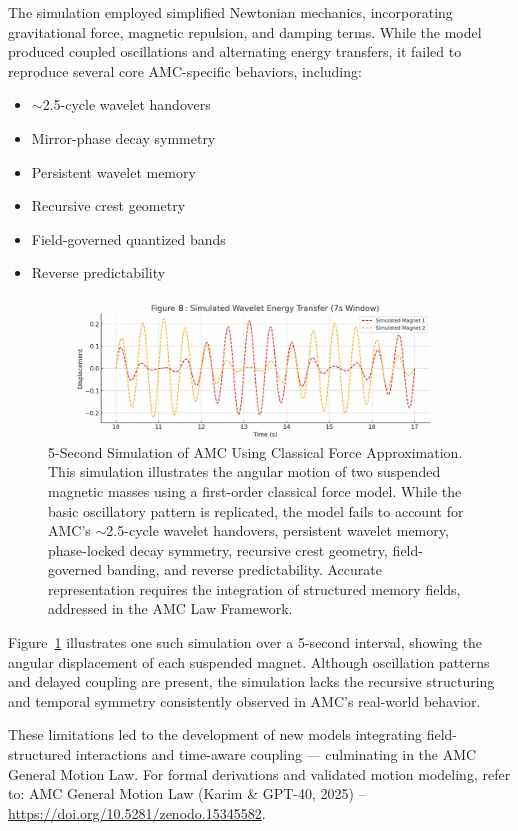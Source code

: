 \documentclass[10pt,aps,pre,onecolumn,superscriptaddress,notitlepage]{revtex4-2}
\begin{document}
The simulation employed simplified Newtonian mechanics, incorporating gravitational force, magnetic repulsion, and damping terms. While the model produced coupled oscillations and alternating energy transfers, it failed to reproduce several core AMC-specific behaviors, including:

\begin{itemize}
  \item $\sim$2.5-cycle wavelet handovers
  \item Mirror-phase decay symmetry
  \item Persistent wavelet memory
  \item Recursive crest geometry
  \item Field-governed quantized bands
  \item Reverse predictability
\end{itemize}

\begin{figure}[htbp]
  \centering
  \includegraphics[width=0.8\linewidth]{figures/Figure_8_Simulation_Only.jpg}
  \caption{5-Second Simulation of AMC Using Classical Force Approximation. 
  This simulation illustrates the angular motion of two suspended magnetic masses using a first-order classical force model. While the basic oscillatory pattern is replicated, the model fails to account for AMC’s $\sim$2.5-cycle wavelet handovers, persistent wavelet memory, phase-locked decay symmetry, recursive crest geometry, field-governed banding, and reverse predictability. Accurate representation requires the integration of structured memory fields, addressed in the AMC Law Framework.}
  \label{fig:simulation}
\end{figure}

Figure~\ref{fig:simulation} illustrates one such simulation over a 5-second interval, showing the angular displacement of each suspended magnet. Although oscillation patterns and delayed coupling are present, the simulation lacks the recursive structuring and temporal symmetry consistently observed in AMC’s real-world behavior.

These limitations led to the development of new models integrating field-structured interactions and time-aware coupling — culminating in the AMC General Motion Law. For formal derivations and validated motion modeling, refer to:  
AMC General Motion Law (Karim \& GPT-40, 2025) – \url{https://doi.org/10.5281/zenodo.15345582}.
\end{document}
